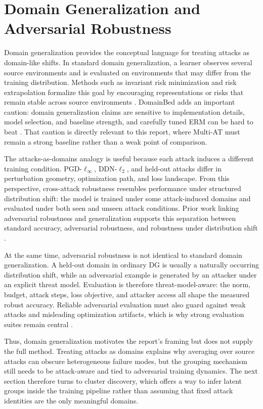 \section{Domain Generalization and Adversarial Robustness}

Domain generalization provides the conceptual language for treating attacks as
domain-like shifts. In standard domain generalization, a learner observes
several source environments and is evaluated on environments that may differ
from the training distribution. Methods such as invariant risk minimization and
risk extrapolation formalize this goal by encouraging representations or risks
that remain stable across source environments
\cite{arjovsky2019irm,krueger2021rex}. DomainBed adds an important caution:
domain generalization claims are sensitive to implementation details, model
selection, and baseline strength, and carefully tuned ERM can be hard to beat
\cite{gulrajani2021domainbed}. That caution is directly relevant to this
report, where Multi-AT must remain a strong baseline rather than a weak point
of comparison.

The attacks-as-domains analogy is useful because each attack induces a
different training condition. PGD-\(\ell_\infty\), DDN-\(\ell_2\), and held-out
attacks differ in perturbation geometry, optimization path, and loss landscape.
From this perspective, cross-attack robustness resembles performance under
structured distribution shift: the model is trained under some attack-induced
domains and evaluated under both seen and unseen attack conditions. Prior work
linking adversarial robustness and generalization supports this separation
between standard accuracy, adversarial robustness, and robustness under
distribution shift
\cite{stutz2019disentangling,alhamoud2022generalizability,zou2023DGrobustness}.

At the same time, adversarial robustness is not identical to standard domain
generalization. A held-out domain in ordinary DG is usually a naturally
occurring distribution shift, while an adversarial example is generated by an
attacker under an explicit threat model. Evaluation is therefore
threat-model-aware: the norm, budget, attack steps, loss objective, and
attacker access all shape the measured robust accuracy. Reliable adversarial
evaluation must also guard against weak attacks and misleading optimization
artifacts, which is why strong evaluation suites remain central
\cite{uesato2018adversarial,croce2020reliable,dai2023multirobustbench}.

Thus, domain generalization motivates the report's framing but does not supply
the full method. Treating attacks as domains explains why averaging over source
attacks can obscure heterogeneous failure modes, but the grouping mechanism
still needs to be attack-aware and tied to adversarial training dynamics. The
next section therefore turns to cluster discovery, which offers a way to infer
latent groups inside the training pipeline rather than assuming that fixed
attack identities are the only meaningful domains.
